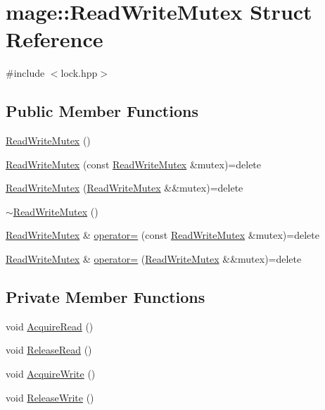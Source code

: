 \hypertarget{structmage_1_1_read_write_mutex}{}\section{mage\+:\+:Read\+Write\+Mutex Struct Reference}
\label{structmage_1_1_read_write_mutex}


{\ttfamily \#include $<$lock.\+hpp$>$}

\subsection*{Public Member Functions}
\begin{DoxyCompactItemize}
\item 
\hyperlink{structmage_1_1_read_write_mutex_aae10694de3862f2d1059477169883940}{Read\+Write\+Mutex} ()
\item 
\hyperlink{structmage_1_1_read_write_mutex_aacb2f69e7e2b084147e1e45628e9dd67}{Read\+Write\+Mutex} (const \hyperlink{structmage_1_1_read_write_mutex}{Read\+Write\+Mutex} \&mutex)=delete
\item 
\hyperlink{structmage_1_1_read_write_mutex_a664e946edfa742dad648fc9fcb29832e}{Read\+Write\+Mutex} (\hyperlink{structmage_1_1_read_write_mutex}{Read\+Write\+Mutex} \&\&mutex)=delete
\item 
\hyperlink{structmage_1_1_read_write_mutex_a73676d9414658d63edfe443ee1d55c8b}{$\sim$\+Read\+Write\+Mutex} ()
\item 
\hyperlink{structmage_1_1_read_write_mutex}{Read\+Write\+Mutex} \& \hyperlink{structmage_1_1_read_write_mutex_a408e06f3c8bcc644e43afbf7e9ac772f}{operator=} (const \hyperlink{structmage_1_1_read_write_mutex}{Read\+Write\+Mutex} \&mutex)=delete
\item 
\hyperlink{structmage_1_1_read_write_mutex}{Read\+Write\+Mutex} \& \hyperlink{structmage_1_1_read_write_mutex_a14ea4d1be75046741a7663e0d86a017a}{operator=} (\hyperlink{structmage_1_1_read_write_mutex}{Read\+Write\+Mutex} \&\&mutex)=delete
\end{DoxyCompactItemize}
\subsection*{Private Member Functions}
\begin{DoxyCompactItemize}
\item 
void \hyperlink{structmage_1_1_read_write_mutex_af78045647078aaf3966c8f1b06e35c92}{Acquire\+Read} ()
\item 
void \hyperlink{structmage_1_1_read_write_mutex_a0af5059a9bd16abd8a21b15e7ebe053d}{Release\+Read} ()
\item 
void \hyperlink{structmage_1_1_read_write_mutex_a76137013107a9c2c1fc05c1e0747965e}{Acquire\+Write} ()
\item 
void \hyperlink{structmage_1_1_read_write_mutex_ad0fd296bdaa212f54a58372c8dfe1d1d}{Release\+Write} ()
\end{DoxyCompactItemize}
